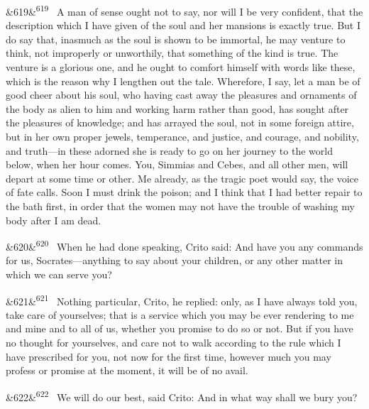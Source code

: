 \documentclass[12pt]{article}
\newcommand{\para}[1][]{\par\noindent\ifx&#1&\else\textsuperscript{\footnotesize #1}~\fi}
\begin{document}
\para[619] A man of sense ought not to say, nor will I be very confident, that the description which I have given of the soul and her mansions is exactly true. But I do say that, inasmuch as the soul is shown to be immortal, he may venture to think, not improperly or unworthily, that something of the kind is true. The venture is a glorious one, and he ought to comfort himself with words like these, which is the reason why I lengthen out the tale. Wherefore, I say, let a man be of good cheer about his soul, who having cast away the pleasures and ornaments of the body as alien to him and working harm rather than good, has sought after the pleasures of knowledge; and has arrayed the soul, not in some foreign attire, but in her own proper jewels, temperance, and justice, and courage, and nobility, and truth---in these adorned she is ready to go on her journey to the world below, when her hour comes. You, Simmias and Cebes, and all other men, will depart at some time or other. Me already, as the tragic poet would say, the voice of fate calls. Soon I must drink the poison; and I think that I had better repair to the bath first, in order that the women may not have the trouble of washing my body after I am dead.

\para[620] When he had done speaking, Crito said: And have you any commands for us, Socrates---anything to say about your children, or any other matter in which we can serve you?

\para[621] Nothing particular, Crito, he replied: only, as I have always told you, take care of yourselves; that is a service which you may be ever rendering to me and mine and to all of us, whether you promise to do so or not. But if you have no thought for yourselves, and care not to walk according to the rule which I have prescribed for you, not now for the first time, however much you may profess or promise at the moment, it will be of no avail.

\para[622] We will do our best, said Crito: And in what way shall we bury you?
\end{document}
